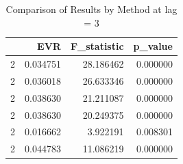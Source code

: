 \begin{table}
\caption{Comparison of Results by Method at lag = 3}
\label{tab:results_by_method}
\begin{tabular}{lrrr}
\toprule
 & EVR & F\_statistic & p\_value \\
\midrule
2 & 0.034751 & 28.186462 & 0.000000 \\
2 & 0.036018 & 26.633346 & 0.000000 \\
2 & 0.038630 & 21.211087 & 0.000000 \\
2 & 0.038630 & 20.249375 & 0.000000 \\
2 & 0.016662 & 3.922191 & 0.008301 \\
2 & 0.044783 & 11.086219 & 0.000000 \\
\bottomrule
\end{tabular}
\end{table}

